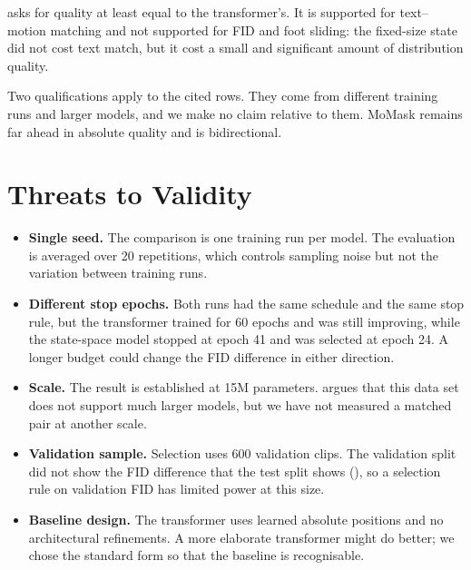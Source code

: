  asks for quality at least equal to the transformer's. It is supported for text--motion matching and not supported for FID and foot sliding: the fixed-size state did not cost text match, but it cost a small and significant amount of distribution quality.

Two qualifications apply to the cited rows. They come from different training runs and larger models, and we make no claim relative to them. MoMask remains far ahead in absolute quality and is bidirectional.

\section{Threats to Validity}
\label{sec:gen_threats}

\begin{itemize}
\item \textbf{Single seed.} The comparison is one training run per model. The evaluation is averaged over 20 repetitions, which controls sampling noise but not the variation between training runs.
\item \textbf{Different stop epochs.} Both runs had the same schedule and the same stop rule, but the transformer trained for 60 epochs and was still improving, while the state-space model stopped at epoch 41 and was selected at epoch 24. A longer budget could change the FID difference in either direction.
\item \textbf{Scale.} The result is established at 15M parameters.  argues that this data set does not support much larger models, but we have not measured a matched pair at another scale.
\item \textbf{Validation sample.} Selection uses 600 validation clips. The validation split did not show the FID difference that the test split shows (), so a selection rule on validation FID has limited power at this size.
\item \textbf{Baseline design.} The transformer uses learned absolute positions and no architectural refinements. A more elaborate transformer might do better; we chose the standard form so that the baseline is recognisable.
\end{itemize}
